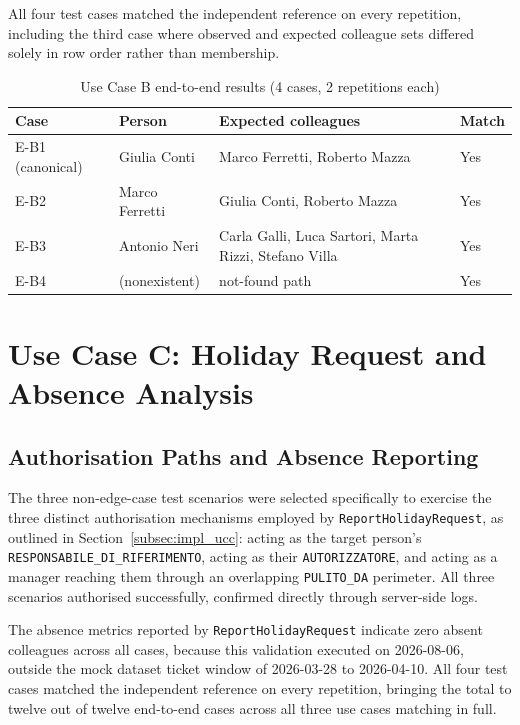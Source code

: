 All four test cases matched the independent reference on every repetition, including the third case where observed and expected colleague sets differed solely in row order rather than membership.

\begin{table}[htbp]
\centering
\caption{Use Case B end-to-end results (4 cases, 2 repetitions each)}
\label{tab:ucb_e2e}
\small
\begin{tabular}{ll p{5.5cm} l}
\hline
\textbf{Case} & \textbf{Person} & \textbf{Expected colleagues} & \textbf{Match} \\
\hline
E-B1 (canonical) & Giulia Conti & Marco Ferretti, Roberto Mazza & Yes \\
E-B2 & Marco Ferretti & Giulia Conti, Roberto Mazza & Yes \\
E-B3 & Antonio Neri & Carla Galli, Luca Sartori, Marta Rizzi, Stefano Villa & Yes \\
E-B4 & (nonexistent) & not-found path & Yes \\
\hline
\end{tabular}
\end{table}

\section{Use Case C: Holiday Request and Absence Analysis}
\label{sec:usecases_holiday_request}

\subsection{Authorisation Paths and Absence Reporting}
\label{subsec:usecases_holiday_workflow}

The three non-edge-case test scenarios were selected specifically to exercise the three distinct authorisation mechanisms employed by \texttt{ReportHolidayRequest}, as outlined in Section~\ref{subsec:impl_ucc}: acting as the target person's \texttt{RESPONSABILE\_DI\_RIFERIMENTO}, acting as their \texttt{AUTORIZZATORE}, and acting as a manager reaching them through an overlapping \texttt{PULITO\_DA} perimeter. All three scenarios authorised successfully, confirmed directly through server-side logs.

The absence metrics reported by \texttt{ReportHolidayRequest} indicate zero absent colleagues across all cases, because this validation executed on 2026-08-06, outside the mock dataset ticket window of 2026-03-28 to 2026-04-10. All four test cases matched the independent reference on every repetition, bringing the total to twelve out of twelve end-to-end cases across all three use cases matching in full.

